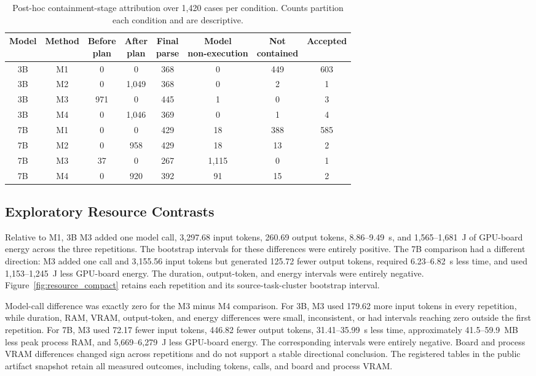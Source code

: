 \documentclass{article}
\newcommand{\Mone}{\textsc{M1}\xspace}
\newcommand{\Mtwo}{\textsc{M2}\xspace}
\newcommand{\Mthree}{\textsc{M3}\xspace}
\newcommand{\Mfour}{\textsc{M4}\xspace}
\begin{document}
\begin{table}[t]
\caption{Post-hoc containment-stage attribution over 1,420 cases per
condition. Counts partition each condition and are descriptive.}
\label{tab:stage_counts}
\centering
\footnotesize
\setlength{\tabcolsep}{3pt}
\begin{tabular}{@{}cccccccc@{}}
\toprule
Model & Method & \shortstack{Before\\plan} & \shortstack{After\\plan} &
\shortstack{Final\\parse} & \shortstack{Model\\non-execution} &
\shortstack{Not\\contained} & Accepted \\
\midrule
3B & \Mone & 0 & 0 & 368 & 0 & 449 & 603 \\
3B & \Mtwo & 0 & 1,049 & 368 & 0 & 2 & 1 \\
3B & \Mthree & 971 & 0 & 445 & 1 & 0 & 3 \\
3B & \Mfour & 0 & 1,046 & 369 & 0 & 1 & 4 \\
7B & \Mone & 0 & 0 & 429 & 18 & 388 & 585 \\
7B & \Mtwo & 0 & 958 & 429 & 18 & 13 & 2 \\
7B & \Mthree & 37 & 0 & 267 & 1,115 & 0 & 1 \\
7B & \Mfour & 0 & 920 & 392 & 91 & 15 & 2 \\
\bottomrule
\end{tabular}
\end{table}

\subsection{Exploratory Resource Contrasts}

Relative to \Mone, 3B \Mthree added one model call, 3,297.68 input tokens,
260.69 output tokens, 8.86--9.49~s, and 1,565--1,681~J of GPU-board energy
across the three repetitions. The bootstrap intervals for these differences
were entirely positive. The 7B comparison had a different direction:
\Mthree added one call and 3,155.56 input tokens but generated 125.72 fewer
output tokens, required 6.23--6.82~s less time, and used 1,153--1,245~J less
GPU-board energy. The duration, output-token, and energy intervals were
entirely negative. Figure~\ref{fig:resource_compact} retains each repetition
and its source-task-cluster bootstrap interval.

Model-call difference was exactly zero for the \Mthree{} minus \Mfour
comparison. For 3B, \Mthree used 179.62 more input tokens in every repetition,
while duration, RAM, VRAM, output-token, and energy differences were small,
inconsistent, or had intervals reaching zero outside the first repetition. For
7B, \Mthree used 72.17 fewer input tokens, 446.82 fewer output tokens,
31.41--35.99~s less time, approximately 41.5--59.9~MB less peak process RAM,
and 5,669--6,279~J less GPU-board energy. The corresponding intervals were
entirely negative. Board and process VRAM differences changed sign across
repetitions and do not support a stable directional conclusion. The registered
tables in the public artifact snapshot retain all measured outcomes, including
tokens, calls, and board and process VRAM.
\end{document}

